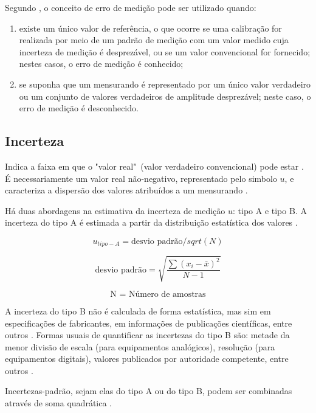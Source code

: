 Segundo , o conceito de erro de medição pode ser utilizado quando:
\begin{enumerate}
\item existe um único valor de referência, o que ocorre se uma calibração for realizada por meio de um padrão de medição com um valor medido cuja incerteza de medição é desprezável, ou se um valor convencional for fornecido; nestes casos, o erro de medição é conhecido;
\item se suponha que um mensurando é representado por um único valor verdadeiro ou um conjunto de valores verdadeiros de amplitude desprezável; neste caso, o erro de medição é desconhecido.
\end{enumerate}

\subsection{Incerteza}
Indica a faixa em que o "valor real"\ (valor verdadeiro convencional) pode estar \cite{slidesCalibracaoLacen}. É necessariamente um valor real não-negativo, representado pelo simbolo $u$, e caracteriza a dispersão dos valores atribuídos a um
mensurando \cite{VIM}.

Há duas abordagens na estimativa da incerteza de medição $u$:
tipo A e tipo B. A incerteza do tipo A é estimada a partir da
distribuição estatística dos valores \cite{slidesCalibracaoPaulo}.

$$
u_{tipo-A} = \text{desvio padrão} / sqrt(N)
$$

$$
\text{desvio padrão} = \sqrt{\frac{\sum(x_i - \bar{x})^2}{N-1}}
$$

$$
\text{N = Número de amostras}
$$


A incerteza do tipo B não é calculada de forma estatística, mas sim em especificações de fabricantes, em informações de publicações científicas, entre outros \cite{slidesCalibracaoPaulo}. Formas usuais de quantificar as incertezas do tipo B são: metade da menor divisão de escala (para equipamentos analógicos), resolução (para equipamentos digitais), valores publicados por autoridade competente, entre outros \cite{VIM}.



Incertezas-padrão, sejam elas do tipo A ou do tipo B, podem ser combinadas através de soma quadrática \cite{slidesCalibracaoPaulo}.

